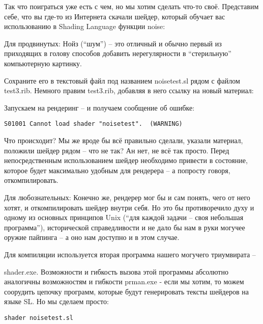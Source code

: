  Так что поиграться уже есть с чем, но мы хотим
    сделать что-то своё. Представим себе, что вы где-то из Интернета
    скачали шейдер, который обучает вас использованию в Shading
    Language функции noise:
  

 Для
    продвинутых: Нойз (“шум”) – это
    отличный и обычно первый из приходящих в голову способов добавить
    нерегулярности в “стерильную” компьютерную картинку.
  

 Сохраните его в текстовый файл под названием
    noisetest.sl рядом с файлом test3.rib. Немного правим test3.rib,
    добавляя в него ссылку на новый материал:
  

 Запускаем на рендеринг – и получаем сообщение об ошибке:
  
\begin{lstlisting}[frame=single, framerule=0pt, framesep=10pt, xleftmargin=10pt, xrightmargin=10pt, basicstyle=\ttfamily \small, backgroundcolor=\color{light-gray}]
S01001 Cannot load shader "noisetest".  (WARNING)
\end{lstlisting}

 Что происходит? Мы же вроде бы всё правильно
    сделали, указали материал, положили шейдер рядом – что не так? Ан
    нет, не всё так просто. Перед непосредственным использованием
    шейдер необходимо привести в состояние, которое будет максимально
    удобным для рендерера – а попросту говоря,
    откомпилировать.
  

 Для
    любознательных: Конечно же, рендерер
    мог бы и сам понять, чего от него хотят, и откомпилировать шейдер
    внутри себя. Но это бы противоречило духу и одному из основных
    принципов Unix (“для каждой задачи – своя небольшая программа”),
    исторической справедливости и не дало бы  нам в руки могучее оружие
    пайпинга – а оно нам доступно и в этом случае.
  

 Для компиляции используется вторая программа нашего
    могучего триумвирата –
  

 shader.exe. Возможности и гибкость вызова этой
    программы абсолютно аналогичны возможностям и гибкости
    prman.exe  - если мы
    хотим, то можем соорудить цепочку программ, которые будут
    генерировать тексты шейдеров на языке SL. Но мы сделаем
    просто:
  
\begin{lstlisting}[frame=single, framerule=0pt, framesep=10pt, xleftmargin=10pt, xrightmargin=10pt, basicstyle=\ttfamily \small, backgroundcolor=\color{light-gray}]
shader noisetest.sl
\end{lstlisting}

